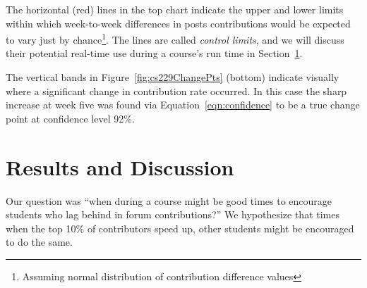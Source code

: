 The horizontal (red) lines in the top chart indicate the upper and
lower limits within which week-to-week differences in posts
contributions would be expected to vary just by
chance\footnote{Assuming normal distribution of contribution
  difference values}. The lines are called {\em control limits}, and
we will discuss their potential real-time use during a course's run
time in Section~\ref{sec:discussion}.

The vertical bands in Figure~\ref{fig:cs229ChangePts} (bottom)
indicate visually where a significant change in contribution rate
occurred. In this case the sharp increase at week five was found via
Equation~\ref{eqn:confidence} to be a true change point at confidence
level 92\%.

\section{Results and Discussion}
\label{sec:discussion}

Our question was ``when during a course might be good times to
encourage students who lag behind in forum contributions?'' We
hypothesize that times when the top 10\% of contributors speed up,
other students might be encouraged to do the same.

